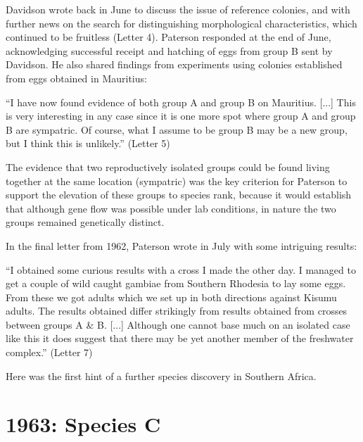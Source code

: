 \documentclass[a4paper,11pt,abstracton,hidelinks]{scrartcl}
\begin{document}
Davidson wrote back in June to discuss the issue of reference colonies, and with further news on the search for distinguishing morphological characteristics, which continued to be fruitless (Letter 4).
%
Paterson responded at the end of June, acknowledging successful receipt and hatching of eggs from group B sent by Davidson.
%
He also shared findings from experiments using colonies established from eggs obtained in Mauritius:
\begin{displayquote}
``I have now found evidence of both group A and group B on Mauritius. [...] 
%
This is very interesting in any case since it is one more spot where group A and group B are sympatric.
%
Of course, what I assume to be group B may be a new group, but I think this is unlikely.'' (Letter 5)
\end{displayquote}
The evidence that two reproductively isolated groups could be found living together at the same location (sympatric) was the key criterion for Paterson to support the elevation of these groups to species rank, because it would establish that although gene flow was possible under lab conditions, in nature the two groups remained genetically distinct.


In the final letter from 1962, Paterson wrote in July with some intriguing results:
\begin{displayquote}
``I obtained some curious results with a cross I made the other day. I managed to get a couple of wild caught gambiae from Southern Rhodesia to lay some eggs. From these we got adults which we set up in both directions against Kisumu adults. The results obtained differ strikingly from results obtained from crosses between groups A \& B. [...] Although one cannot base much on an isolated case like this it does suggest that there may be yet another member of the freshwater complex.'' (Letter 7)
\end{displayquote}
%
Here was the first hint of a further species discovery in Southern Africa.



\section{1963: Species C}
\end{document}
